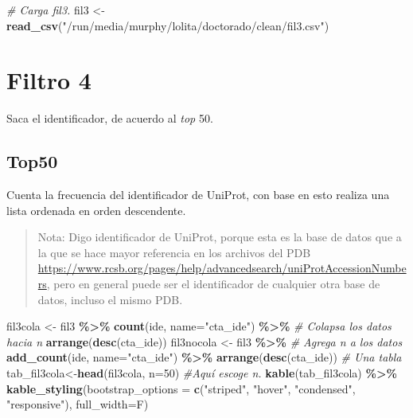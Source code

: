 \documentclass[
]{book}
\newenvironment{Shaded}{\begin{snugshade}}{\end{snugshade}}
\newcommand{\CommentTok}[1]{\textcolor[rgb]{0.56,0.35,0.01}{\textit{#1}}}
\newcommand{\DataTypeTok}[1]{\textcolor[rgb]{0.13,0.29,0.53}{#1}}
\newcommand{\DecValTok}[1]{\textcolor[rgb]{0.00,0.00,0.81}{#1}}
\newcommand{\KeywordTok}[1]{\textcolor[rgb]{0.13,0.29,0.53}{\textbf{#1}}}
\newcommand{\NormalTok}[1]{#1}
\newcommand{\OperatorTok}[1]{\textcolor[rgb]{0.81,0.36,0.00}{\textbf{#1}}}
\newcommand{\StringTok}[1]{\textcolor[rgb]{0.31,0.60,0.02}{#1}}
\begin{document}
\begin{Shaded}
\begin{Highlighting}[]
\CommentTok{\# Carga fil3.}
\NormalTok{fil3 \textless{}{-}}\StringTok{ }\KeywordTok{read\_csv}\NormalTok{(}\StringTok{"/run/media/murphy/lolita/doctorado/clean/fil3.csv"}\NormalTok{)}
\end{Highlighting}
\end{Shaded}

\hypertarget{filtro-4}{%
\section{Filtro 4}\label{filtro-4}}

Saca el identificador, de acuerdo al \emph{top} 50.

\hypertarget{top50}{%
\subsection{Top50}\label{top50}}

Cuenta la frecuencia del identificador de UniProt, con base en esto realiza una lista ordenada en orden descendente.

\begin{quote}
Nota: Digo identificador de UniProt, porque esta es la base de datos que a la que se hace mayor referencia en los archivos del PDB \url{https://www.rcsb.org/pages/help/advancedsearch/uniProtAccessionNumbers}, pero en general puede ser el identificador de cualquier otra base de datos, incluso el mismo PDB.
\end{quote}

\begin{Shaded}
\begin{Highlighting}[]
\NormalTok{fil3cola \textless{}{-}}\StringTok{ }\NormalTok{fil3 }\OperatorTok{\%\textgreater{}\%}
\StringTok{  }\KeywordTok{count}\NormalTok{(ide, }\DataTypeTok{name=}\StringTok{"cta\_ide"}\NormalTok{) }\OperatorTok{\%\textgreater{}\%}\StringTok{ }\CommentTok{\# Colapsa los datos hacia n}
\StringTok{  }\KeywordTok{arrange}\NormalTok{(}\KeywordTok{desc}\NormalTok{(cta\_ide))}
\NormalTok{fil3nocola \textless{}{-}}\StringTok{ }\NormalTok{fil3 }\OperatorTok{\%\textgreater{}\%}\StringTok{ }\CommentTok{\# Agrega n a los datos}
\StringTok{   }\KeywordTok{add\_count}\NormalTok{(ide, }\DataTypeTok{name=}\StringTok{"cta\_ide"}\NormalTok{) }\OperatorTok{\%\textgreater{}\%}
\StringTok{   }\KeywordTok{arrange}\NormalTok{(}\KeywordTok{desc}\NormalTok{(cta\_ide)) }
\CommentTok{\# Una tabla}
\NormalTok{tab\_fil3cola\textless{}{-}}\KeywordTok{head}\NormalTok{(fil3cola, }\DataTypeTok{n=}\DecValTok{50}\NormalTok{) }\CommentTok{\#Aquí escoge n.}
\KeywordTok{kable}\NormalTok{(tab\_fil3cola) }\OperatorTok{\%\textgreater{}\%}
\StringTok{  }\KeywordTok{kable\_styling}\NormalTok{(}\DataTypeTok{bootstrap\_options =} \KeywordTok{c}\NormalTok{(}\StringTok{"striped"}\NormalTok{, }\StringTok{"hover"}\NormalTok{, }\StringTok{"condensed"}\NormalTok{, }\StringTok{"responsive"}\NormalTok{), }\DataTypeTok{full\_width=}\NormalTok{F)}
\end{Highlighting}
\end{Shaded}
\end{document}
